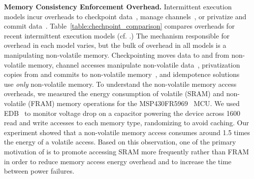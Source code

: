 \textbf{Memory Consistency Enforcement Overhead.} Intermittent execution models incur overheads to checkpoint data~\cite{dino,ratchet,quickrecall,mementos}, manage channels~\cite{chain}, or privatize and commit data~\cite{alpaca}. Table~\ref{table:chechpoint_comparison} compares overheads for recent intermittent execution models (cf. \cite[Sec. 2.4]{alpaca}.) The mechanism responsible for overhead in each model varies, but the bulk of overhead in all models is a manipulating non-volatile memory. Checkpointing moves data to and from non-volatile memory, channel accesses manipulate non-volatile data~\cite{chain}, privatization copies from and commits to non-volatile memory~\cite{alpaca}, and idempotence solutions~\cite{ratchet} use {\em only} non-volatile memory.  
To understand the non-volatile memory access overheads, we measured the energy consumption of volatile (SRAM) and non-volatile (FRAM) memory operations for the MSP430FR5969~\cite{msp430datasheet} MCU. We used EDB~\cite{edb} to monitor voltage drop on a capacitor powering the device across 1600 read and write accesses to each memory type, randomizing to avoid caching. Our experiment showed that a non-volatile memory access consumes around 1.5 times the energy of a volatile access.
Based on this observation, one of the primary motivation of \sys is to promote accessing SRAM more frequently rather than FRAM in order to reduce memory access energy overhead and to increase the time between power failures. 

